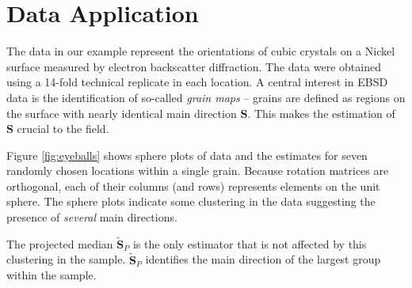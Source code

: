 \section{Data Application}\label{sec:data}

The data in our example represent the orientations of cubic crystals on a Nickel surface measured by electron backscatter diffraction. The data were obtained using a 14-fold technical replicate in each location. 
A central interest in EBSD data is the identification of so-called {\it grain maps} -- grains are defined as regions on the surface with nearly identical main direction $\bm S$. This makes the estimation of $\bm S$ crucial to the field. 


Figure \ref{fig:eyeballs} shows sphere plots of  data and the estimates for seven randomly chosen locations within a single grain.  Because rotation matrices are orthogonal, each of their columns (and rows) represents elements on the unit sphere. The sphere plots indicate some clustering in the data suggesting the presence of \emph{several} main directions. 

The projected median $\widetilde{\bm S}_P$ is the only estimator that is not affected by this clustering in the sample. $\widetilde{\bm S}_P$ identifies the main direction of the largest group within the sample.


%

